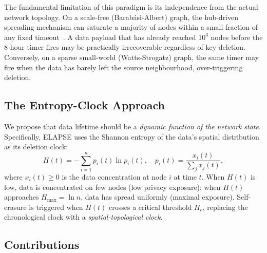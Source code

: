 \documentclass[review,12pt]{elsarticle}
\newcommand{\Hc}{H_c}
\newcommand{\Hmax}{H_{\max}}
\begin{document}
The fundamental limitation of this paradigm is its independence from the actual
network topology. On a scale-free (Barab\'asi-Albert) graph, the hub-driven
spreading mechanism can saturate a majority of nodes within a small fraction of
any fixed timeout~\cite{barabasi1999emergence,pastor2015epidemic}. A data payload
that has already reached $10^3$ nodes before the 8-hour timer fires may be
practically irrecoverable regardless of key deletion. Conversely, on a
sparse small-world (Watts-Strogatz) graph, the same timer may fire when the
data has barely left the source neighbourhood, over-triggering deletion.

\subsection{The Entropy-Clock Approach}

We propose that data lifetime should be a \emph{dynamic function of the
network state}. Specifically, ELAPSE uses the Shannon entropy of the data's
spatial distribution as its deletion clock:
\begin{equation}
  H(t) = -\sum_{i=1}^{n} p_i(t) \ln p_i(t), \quad
  p_i(t) = \frac{x_i(t)}{\sum_j x_j(t)},
  \label{eq:entropy}
\end{equation}
where $x_i(t) \geq 0$ is the data concentration at node $i$ at time $t$.
When $H(t)$ is low, data is concentrated on few nodes (low privacy exposure);
when $H(t)$ approaches $\Hmax = \ln n$, data has spread uniformly (maximal
exposure). Self-erasure is triggered when $H(t)$ crosses a critical
threshold $\Hc$, replacing the chronological clock with a
\emph{spatial-topological clock}.

\subsection{Contributions}
\end{document}
